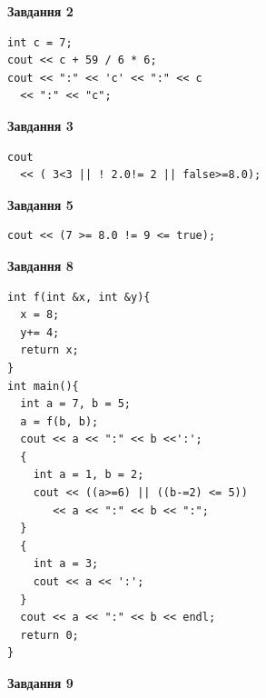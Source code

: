\documentclass[12pt, ukrainian]{article}
\begin{document}
{\begin {large}
\begin{minipage}[t]{7.0cm}
\end{minipage}
\vline \hspace{1mm}
\begin{minipage}[t]{11.0cm}

\begin{center}
\textbf{Завдання 2}
\end{center}
\vspace{-8mm}

\begin{verbatim}
int c = 7;
cout << c + 59 / 6 * 6;
cout << ":" << 'c' << ":" << c 
  << ":" << "c";
\end{verbatim}



\begin{center}
\textbf{Завдання 3}
\end{center}
\vspace{-8mm}

\begin{verbatim}
cout 
  << ( 3<3 || ! 2.0!= 2 || false>=8.0);
\end{verbatim}



\begin{center}
\textbf{Завдання 5}
\end{center}
\vspace{-8mm}

\begin{verbatim}
cout << (7 >= 8.0 != 9 <= true);
\end{verbatim}



\begin{center}
\textbf{Завдання 8}
\end{center}
\vspace{-8mm}

\begin{verbatim}
int f(int &x, int &y){
  x = 8;
  y+= 4;
  return x;
}
int main(){
  int a = 7, b = 5;
  a = f(b, b);
  cout << a << ":" << b <<':';
  {
    int a = 1, b = 2;
    cout << ((a>=6) || ((b-=2) <= 5))
       << a << ":" << b << ":";
  }
  {
    int a = 3;
    cout << a << ':';
  }
  cout << a << ":" << b << endl;
  return 0;
}
\end{verbatim}

\end{minipage}


\begin{minipage}[t]{7.0cm}

\begin{center}
\textbf{Завдання 9}
\end{center}
\vspace{-8mm}


\end{minipage}
\end{large}}
\end{document}
